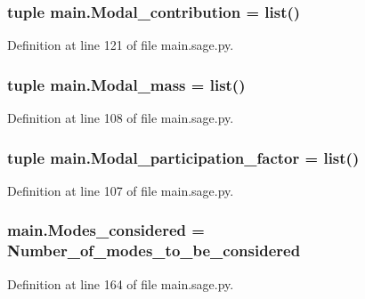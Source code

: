 \subsubsection[{Modal\+\_\+contribution}]{\setlength{\rightskip}{0pt plus 5cm}tuple main.\+Modal\+\_\+contribution = list()}\label{a00039_ae8c706be82800a75da37e5da67018f90}


Definition at line 121 of file main.\+sage.\+py.

\hypertarget{a00039_ac7e5d737af53772a131628449c0e6477}{}
\subsubsection[{Modal\+\_\+mass}]{\setlength{\rightskip}{0pt plus 5cm}tuple main.\+Modal\+\_\+mass = list()}\label{a00039_ac7e5d737af53772a131628449c0e6477}


Definition at line 108 of file main.\+sage.\+py.

\hypertarget{a00039_a4ad22e0a1336b0e665ff865d68f4fcc1}{}
\subsubsection[{Modal\+\_\+participation\+\_\+factor}]{\setlength{\rightskip}{0pt plus 5cm}tuple main.\+Modal\+\_\+participation\+\_\+factor = list()}\label{a00039_a4ad22e0a1336b0e665ff865d68f4fcc1}


Definition at line 107 of file main.\+sage.\+py.

\hypertarget{a00039_a9d22ac077c22a97b1b095068a1500d16}{}
\subsubsection[{Modes\+\_\+considered}]{\setlength{\rightskip}{0pt plus 5cm}main.\+Modes\+\_\+considered = Number\+\_\+of\+\_\+modes\+\_\+to\+\_\+be\+\_\+considered}\label{a00039_a9d22ac077c22a97b1b095068a1500d16}


Definition at line 164 of file main.\+sage.\+py.

\hypertarget{a00039_a0cc58897a39912c706ab64fd26e0d62e}{}
